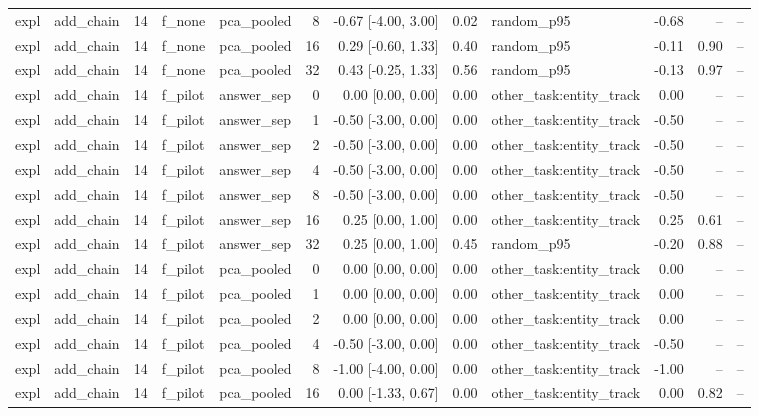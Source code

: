 \begin{tabular}{llrllrrrlrrr}
expl & add\_chain & 14 & f\_none & pca\_pooled & 8 & -0.67 [-4.00, 3.00] & 0.02 & random\_p95 & -0.68 & -- & -- \\
expl & add\_chain & 14 & f\_none & pca\_pooled & 16 & 0.29 [-0.60, 1.33] & 0.40 & random\_p95 & -0.11 & 0.90 & -- \\
expl & add\_chain & 14 & f\_none & pca\_pooled & 32 & 0.43 [-0.25, 1.33] & 0.56 & random\_p95 & -0.13 & 0.97 & -- \\
expl & add\_chain & 14 & f\_pilot & answer\_sep & 0 & 0.00 [0.00, 0.00] & 0.00 & other\_task:entity\_track & 0.00 & -- & -- \\
expl & add\_chain & 14 & f\_pilot & answer\_sep & 1 & -0.50 [-3.00, 0.00] & 0.00 & other\_task:entity\_track & -0.50 & -- & -- \\
expl & add\_chain & 14 & f\_pilot & answer\_sep & 2 & -0.50 [-3.00, 0.00] & 0.00 & other\_task:entity\_track & -0.50 & -- & -- \\
expl & add\_chain & 14 & f\_pilot & answer\_sep & 4 & -0.50 [-3.00, 0.00] & 0.00 & other\_task:entity\_track & -0.50 & -- & -- \\
expl & add\_chain & 14 & f\_pilot & answer\_sep & 8 & -0.50 [-3.00, 0.00] & 0.00 & other\_task:entity\_track & -0.50 & -- & -- \\
expl & add\_chain & 14 & f\_pilot & answer\_sep & 16 & 0.25 [0.00, 1.00] & 0.00 & other\_task:entity\_track & 0.25 & 0.61 & -- \\
expl & add\_chain & 14 & f\_pilot & answer\_sep & 32 & 0.25 [0.00, 1.00] & 0.45 & random\_p95 & -0.20 & 0.88 & -- \\
expl & add\_chain & 14 & f\_pilot & pca\_pooled & 0 & 0.00 [0.00, 0.00] & 0.00 & other\_task:entity\_track & 0.00 & -- & -- \\
expl & add\_chain & 14 & f\_pilot & pca\_pooled & 1 & 0.00 [0.00, 0.00] & 0.00 & other\_task:entity\_track & 0.00 & -- & -- \\
expl & add\_chain & 14 & f\_pilot & pca\_pooled & 2 & 0.00 [0.00, 0.00] & 0.00 & other\_task:entity\_track & 0.00 & -- & -- \\
expl & add\_chain & 14 & f\_pilot & pca\_pooled & 4 & -0.50 [-3.00, 0.00] & 0.00 & other\_task:entity\_track & -0.50 & -- & -- \\
expl & add\_chain & 14 & f\_pilot & pca\_pooled & 8 & -1.00 [-4.00, 0.00] & 0.00 & other\_task:entity\_track & -1.00 & -- & -- \\
expl & add\_chain & 14 & f\_pilot & pca\_pooled & 16 & 0.00 [-1.33, 0.67] & 0.00 & other\_task:entity\_track & 0.00 & 0.82 & -- \\

\end{tabular}
